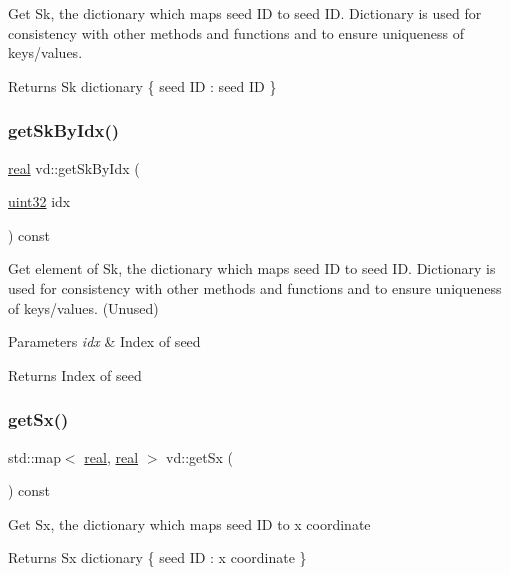 Get Sk, the dictionary which maps seed ID to seed ID. Dictionary is used for consistency with other methods and functions and to ensure uniqueness of keys/values. \begin{DoxyReturn}{Returns}
Sk dictionary \{ seed ID \+: seed ID \} 
\end{DoxyReturn}
\mbox{\label{classvd_a4d2c835e7804c4242dce6d411f01ce0a}} 
\subsubsection{\texorpdfstring{get\+Sk\+By\+Idx()}{getSkByIdx()}}
{\footnotesize\ttfamily \mbox{\hyperlink{typedefs_8cpp_a58a0c7cf2501f4492da833421be92547}{real}} vd\+::get\+Sk\+By\+Idx (\begin{DoxyParamCaption}\item[{\mbox{\hyperlink{typedefs_8cpp_a8ad23e2333787a214e20a58a284a5a60}{uint32}}}]{idx }\end{DoxyParamCaption}) const}

Get element of Sk, the dictionary which maps seed ID to seed ID. Dictionary is used for consistency with other methods and functions and to ensure uniqueness of keys/values. (Unused) 
\begin{DoxyParams}{Parameters}
{\em idx} & Index of seed \\
\hline
\end{DoxyParams}
\begin{DoxyReturn}{Returns}
Index of seed 
\end{DoxyReturn}
\mbox{\label{classvd_a340f3f92b9ae32ff0f3eb2ce6cf12bd6}} 
\subsubsection{\texorpdfstring{get\+Sx()}{getSx()}}
{\footnotesize\ttfamily std\+::map$<$ \mbox{\hyperlink{typedefs_8cpp_a58a0c7cf2501f4492da833421be92547}{real}}, \mbox{\hyperlink{typedefs_8cpp_a58a0c7cf2501f4492da833421be92547}{real}} $>$ vd\+::get\+Sx (\begin{DoxyParamCaption}{ }\end{DoxyParamCaption}) const}

Get Sx, the dictionary which maps seed ID to x coordinate \begin{DoxyReturn}{Returns}
Sx dictionary \{ seed ID \+: x coordinate \} 
\end{DoxyReturn}
\mbox{\label{classvd_a960d4b8fbedb7cbb0686ad42e19d6396}} 
